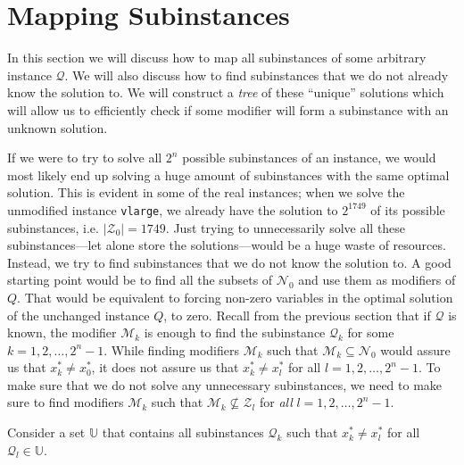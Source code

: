 \section{Mapping Subinstances}
In this section we will discuss how to map all subinstances of some arbitrary
instance $\mathcal{Q}$. We will also discuss how to find 
subinstances that we do not already know the solution to.
We will construct a \emph{tree} of these ``unique'' solutions which will allow
us to efficiently check if some modifier will form a subinstance with an
unknown solution.

If we were to try to solve all $2^n$ possible subinstances of an
instance, we would most likely end up solving a huge amount of subinstances
with the same optimal solution. This is evident in some of the real
instances; when we solve the unmodified instance \texttt{vlarge}, we already
have the solution to $2^{1749}$ of its possible subinstances, i.e.
$|\mathcal{Z}_0| = 1749$.
Just trying to unnecessarily solve all these subinstances---let alone store the
solutions---would be a huge waste of resources.
Instead, we try to find subinstances that we do not know the solution to.
A good starting point would be to find all the subsets of $\mathcal{N}_0$ and
use them as modifiers of $Q$. That would be equivalent to forcing non-zero
variables in the optimal solution of the unchanged instance $Q$, to zero.
Recall from the previous section that if $\mathcal{Q}$ is known, the modifier
$\mathcal{M}_k$ is enough to find the subinstance $\mathcal{Q}_k$ for some
$k=1,2,\ldots,2^n-1$.
While finding modifiers $\mathcal{M}_k$ such that
$\mathcal{M}_k \subseteq \mathcal{N}_0$ would assure us that $x_k^*\neq x_0^*$,
it does not assure us that $x_k^* \neq x_l^*$ for all $l=1,2,\ldots,2^n-1$.
To make sure that we do not solve any unnecessary subinstances, we need to make
sure to find modifiers $\mathcal{M}_k$ such that
$\mathcal{M}_k \not \subseteq \mathcal{Z}_l$
for \emph{all} $l=1,2,\ldots,2^n-1$.

Consider a set $\mathbb{U}$ that contains all subinstances $\mathcal{Q}_k$
such that $x_k^* \neq x_l^*$ for all $\mathcal{Q}_l \in \mathbb{U}$.
